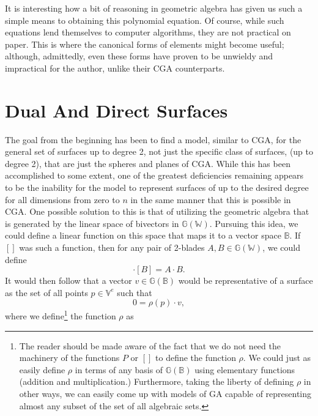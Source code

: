 \documentclass{birkjour}
\theoremstyle{definition}
\theoremstyle{remark}
\numberwithin{equation}{section}
\newcommand{\G}{\mathbb{G}}
\newcommand{\V}{\mathbb{V}}
\newcommand{\W}{\mathbb{W}}
\newcommand{\B}{\mathbb{B}}
\begin{document}
It is interesting how a bit of reasoning in geometric algebra has given us such a simple means
to obtaining this polynomial equation.
Of course, while such equations lend themselves to computer algorithms, they
are not practical on paper.  This is where the canonical forms of elements might become
useful; although, admittedly, even these forms have proven to be unwieldy
and impractical for the author, unlike their CGA counterparts.

\section{Dual And Direct Surfaces}\label{sec_deal_dir_surf}

The goal from the beginning has been to find a model, similar
to CGA, for the general set of surfaces up to degree 2,
not just the specific class of surfaces, (up to degree 2), that are just the spheres and planes of CGA.
While this has been accomplished to some extent, one of the greatest deficiencies
remaining appears to be the inability for the model to represent surfaces of up to
the desired degree for
all dimensions from zero to $n$ in the same manner that this is possible in CGA.
One possible solution to this is that of utilizing the geometric
algebra that is generated by the linear space of bivectors in $\G(\W)$.  Pursuing
this idea, we could
define a linear function on this space that maps it to a vector space $\B$.  If $[]$ was such
a function, then for any pair of 2-blades $A,B\in\G(\W)$, we could define
\begin{equation}
[A]\cdot [B]=A\cdot B.
\end{equation}
It would then follow that a vector $v\in\G(\B)$ would be
representative of a surface as the set of all points $p\in\V^e$ such that
\begin{equation}\label{equ_dual_surf_set}
0 = \rho(p)\cdot v,
\end{equation}
where we define\footnote{The reader should be made aware of the fact
that we do not need the machinery of the functions $P$ or $[]$ to
define the function $\rho$.  We could just as easily define $\rho$
in terms of any basis of $\G(\B)$ using elementary functions (addition and multiplication.)
Furthermore, taking the liberty of defining
$\rho$ in other ways, we can easily come up with models of GA capable of representing
almost any subset of the set of all algebraic sets.} the function $\rho$ as
\end{document}
